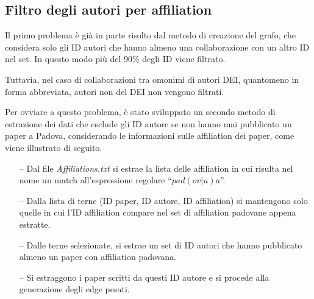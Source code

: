 \documentclass[12pt,a4paper,twoside]{report}
\begin{document}
\subsection{Filtro degli autori per affiliation} \label{ssc:padovani}
Il primo problema è già in parte risolto dal metodo di creazione del grafo, che considera solo gli
ID autori che hanno almeno una collaborazione con un altro ID nel set. In questo modo più del 90\%
degli ID viene filtrato.

Tuttavia, nel caso di collaborazioni tra omonimi di autori DEI, quantomeno in forma abbreviata,
autori non del DEI non vengono filtrati.

%

Per ovviare a questo problema, è stato sviluppato un secondo metodo di estrazione dei dati che
esclude gli ID autore se non hanno mai pubblicato un paper a Padova, considerando le informazioni
sulle affiliation dei paper, come viene illustrato di seguito.

\begin{itemize}[noitemsep, topsep=0pt]
\item[--]
Dal file \textit{Affiliations.txt} si estrae la lista delle affiliation in cui risulta nel nome un match all'espressione regolare ``$pad(ov|u)a$''.
\item[--]
Dalla lista di terne (ID paper, ID autore, ID affiliation) si mantengono solo quelle in cui l'ID affiliation compare nel set di affiliation padovane appena estratte.
\item[--]
Dalle terne selezionate, si estrae un set di ID autori che hanno pubblicato almeno un paper con affiliation padovana.
\item[--] %
Si estraggono i paper scritti da questi ID autore e si procede alla generazione degli edge pesati.
\end{itemize}
\end{document}
